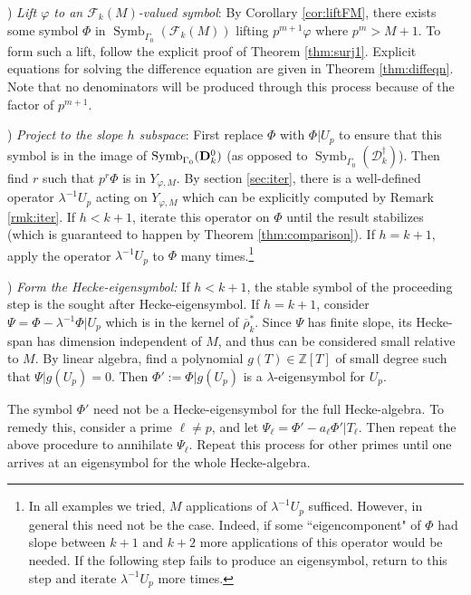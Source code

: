 \documentclass{amsart}
\theoremstyle{plain}
\theoremstyle{definition}
\newcommand{\D}{{\mathcal D}}
\newcommand{\bD}{{\bf D}}
\newcommand{\F}{{\mathcal F}}
\newcommand{\Z}{{\mathbb Z}}
\newcommand{\ol}{\overline}
\newcommand{\olsp}{{\ol{\rho}^*_k}}
\newcommand{\Dvrig}[1]{\bD_{#1}}
\newcommand{\Dkrig}{\Dvrig{k}}
\newcommand{\Dkoc}{\D_k^\dag}
\newcommand{\FkM}{\F_k(M)}
\DeclareMathOperator{\Symb}{Symb}
\newcommand{\MSo}[1]{\Symb_{\Gamma_0}(#1)}
\begin{document}
\vspace{.2cm}

) {\it Lift $\varphi$ to an $\FkM$-valued symbol}:
By Corollary \ref{cor:liftFM}, there exists some symbol $\Phi$ in $\MSo{\FkM}$ lifting $p^{m+1} \varphi$ where $p^m > M+1$.  To form such a lift, follow the explicit proof of Theorem \ref{thm:surj1}.  Explicit equations for solving the difference equation are given in Theorem \ref{thm:diffeqn}.  Note that no denominators will be produced through this process because of the factor of $p^{m+1}$.  

\vspace{.2cm}

) {\it Project to the slope $h$ subspace}:  First replace $\Phi$ with $\Phi \big| U_p$ to ensure that this symbol is in the image of $\MSo{\Dkrig^0}$ (as opposed to $\MSo{\Dkoc}$).  Then find $r$ such that  $p^r \Phi$ is in $Y_{\varphi,M}$. By section \ref{sec:iter}, there is a well-defined operator $\lambda^{-1} U_p$ acting on $Y_{\varphi,M}$ which can be explicitly computed by Remark \ref{rmk:iter}.  If $h < k+1$, iterate this operator on $\Phi$ until the result stabilizes (which is guaranteed to happen by Theorem \ref{thm:comparison}).
If $h = k+1$, apply the operator $\lambda^{-1} U_p$ to $\Phi$ many times.\footnote{In all examples we tried, $M$ applications of $\lambda^{-1} U_p$ sufficed.  However, in general this need not be the case.  Indeed, if some ``eigencomponent" of $\Phi$ had slope between $k+1$ and $k+2$ more applications of this operator would be needed.   If the following step fails to produce an eigensymbol, return to this step and iterate $\lambda^{-1} U_p$ more times.}

\vspace{.2cm}

) {\it Form the Hecke-eigensymbol:}  If $h<k+1$, the stable symbol of the proceeding step is the sought after Hecke-eigensymbol.
If $h=k+1$, consider $\Psi = \Phi - \lambda^{-1} \Phi \big| U_p$ which is in the kernel of $\olsp$.  Since $\Psi$ has finite slope, its Hecke-span has dimension independent of $M$, and thus can be considered small relative to $M$.  By linear algebra, find a polynomial $g(T) \in \Z[T]$ of small degree such that $\Psi \big| g(U_p) = 0$.  Then $\Phi' := \Phi \big| g(U_p)$ is a $\lambda$-eigensymbol for $U_p$.


The symbol $\Phi'$ need not be a Hecke-eigensymbol for the full Hecke-algebra.  To remedy this, consider a prime $\ell \neq p$, and let $\Psi_\ell = \Phi' - a_\ell \Phi' \big| T_\ell$.  Then repeat the above procedure to annihilate $\Psi_\ell$.  Repeat this process for other primes until one arrives at an eigensymbol for the whole Hecke-algebra.  
\end{document}
